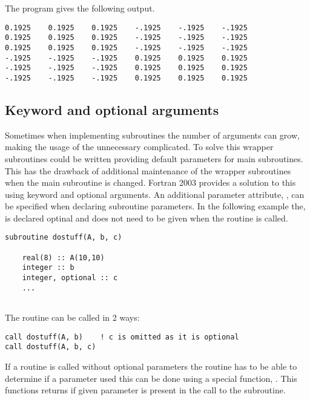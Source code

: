 The program gives the following output.

\begin{lstlisting}[numbers=none,breaklines=false]
0.1925    0.1925    0.1925    -.1925    -.1925    -.1925
0.1925    0.1925    0.1925    -.1925    -.1925    -.1925
0.1925    0.1925    0.1925    -.1925    -.1925    -.1925
-.1925    -.1925    -.1925    0.1925    0.1925    0.1925
-.1925    -.1925    -.1925    0.1925    0.1925    0.1925
-.1925    -.1925    -.1925    0.1925    0.1925    0.1925
\end{lstlisting}

\subsection{Keyword and optional arguments}

Sometimes when implementing subroutines the number of arguments can grow, making the usage of the unnecessary complicated. To solve this wrapper subroutines could be written providing default parameters for main subroutines. This has the drawback of additional maintenance of the wrapper subroutines when the main subroutine is changed. Fortran 2003 provides a solution to this using keyword and optional arguments. An additional parameter attribute, , can be specified when declaring subroutine parameters. In the following example the,  is declared optinal and does not need to be given when the routine is called.

\begin{lstlisting}
subroutine dostuff(A, b, c)

	real(8) :: A(10,10)
	integer :: b
	integer, optional :: c
	...
	
\end{lstlisting}

The  routine can be called in 2 ways:

\begin{lstlisting}
call dostuff(A, b)    ! c is omitted as it is optional
call dostuff(A, b, c) 
\end{lstlisting}

If a routine is called without optional parameters the routine has to be able to determine if a parameter used this can be done using a special function, . This functions returns  if given parameter is present in the call to the subroutine.

